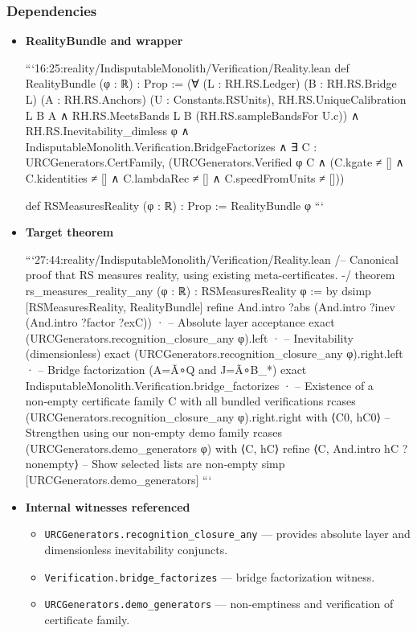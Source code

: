 \documentclass{article}
\begin{document}
\subsubsection{Dependencies}
\begin{itemize}[leftmargin=*]
  \item \textbf{RealityBundle and wrapper}

```16:25:reality/IndisputableMonolith/Verification/Reality.lean
def RealityBundle (φ : ℝ) : Prop :=
  (∀ (L : RH.RS.Ledger) (B : RH.RS.Bridge L) (A : RH.RS.Anchors) (U : Constants.RSUnits),
    RH.RS.UniqueCalibration L B A ∧ RH.RS.MeetsBands L B (RH.RS.sampleBandsFor U.c))
  ∧ RH.RS.Inevitability_dimless φ
  ∧ IndisputableMonolith.Verification.BridgeFactorizes
  ∧ ∃ C : URCGenerators.CertFamily, (URCGenerators.Verified φ C ∧
      (C.kgate ≠ [] ∧ C.kidentities ≠ [] ∧ C.lambdaRec ≠ [] ∧ C.speedFromUnits ≠ []))

def RSMeasuresReality (φ : ℝ) : Prop := RealityBundle φ
```

  \item \textbf{Target theorem}

```27:44:reality/IndisputableMonolith/Verification/Reality.lean
/-- Canonical proof that RS measures reality, using existing meta-certificates. -/
 theorem rs_measures_reality_any (φ : ℝ) : RSMeasuresReality φ := by
  dsimp [RSMeasuresReality, RealityBundle]
  refine And.intro ?abs (And.intro ?inev (And.intro ?factor ?exC))
  · -- Absolute layer acceptance
    exact (URCGenerators.recognition_closure_any φ).left
  · -- Inevitability (dimensionless)
    exact (URCGenerators.recognition_closure_any φ).right.left
  · -- Bridge factorization (A=Ã∘Q and J=Ã∘B_*)
    exact IndisputableMonolith.Verification.bridge_factorizes
  · -- Existence of a non‑empty certificate family C with all bundled verifications
    rcases (URCGenerators.recognition_closure_any φ).right.right with ⟨C0, hC0⟩
    -- Strengthen using our non‑empty demo family
    rcases (URCGenerators.demo_generators φ) with ⟨C, hC⟩
    refine ⟨C, And.intro hC ?nonempty⟩
    -- Show selected lists are non‑empty
    simp [URCGenerators.demo_generators]
```

  \item \textbf{Internal witnesses referenced}
  \begin{itemize}
    \item \texttt{URCGenerators.recognition\_closure\_any} — provides absolute layer and dimensionless inevitability conjuncts.
    \item \texttt{Verification.bridge\_factorizes} — bridge factorization witness.
    \item \texttt{URCGenerators.demo\_generators} — non‑emptiness and verification of certificate family.
  \end{itemize}
\end{itemize}
\end{document}
